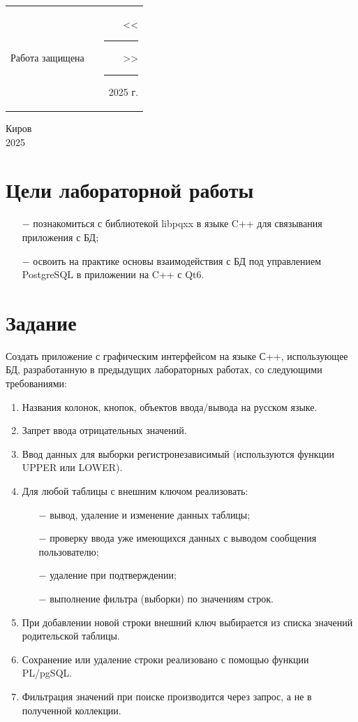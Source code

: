 \documentclass[oneside,a4paper,14pt]{extarticle}
\begin{document}
\noindent
\begin{tabular}{lp{58mm}r}
  Работа защищена &  & \hspace{13mm}<<\rule[-1mm]{5mm}{0.10mm}\/>>\rule[-1mm]{30mm}{0.10mm}\ 2025 г.
\end{tabular}
\vfill

\begin{center}
  Киров\\
  2025
\end{center}

\newpage\thispagestyle{plain}

\section*{Цели лабораторной работы}
\begin{itemize}
  \item[$-$] познакомиться с библиотекой libpqxx в языке C++ для связывания приложения с БД;
  \item[$-$] освоить на практике основы взаимодействия с БД под управлением PostgreSQL в приложении на C++ с Qt6.
\end{itemize}

\section*{Задание}
Создать приложение с графическим интерфейсом на языке С++, использующее БД, разработанную в предыдущих лабораторных работах, со следующими требованиями:
\begin{enumerate}
  \item Названия колонок, кнопок, объектов ввода/вывода на русском языке.
  \item Запрет ввода отрицательных значений.
  \item Ввод данных для выборки регистронезависимый (используются функции UPPER или LOWER).
  \item Для любой таблицы с внешним ключом реализовать:
        \begin{itemize}
          \item[$-$] вывод, удаление и изменение данных таблицы;
          \item[$-$] проверку ввода уже имеющихся данных с выводом сообщения пользователю;
          \item[$-$] удаление при подтверждении;
          \item[$-$] выполнение фильтра (выборки) по значениям строк.
        \end{itemize}
  \item При добавлении новой строки внешний ключ выбирается из списка значений родительской таблицы.
  \item Сохранение или удаление строки реализовано с помощью функции PL/pgSQL.
  \item Фильтрация значений при поиске производится через запрос, а не в полученной коллекции.
\end{enumerate}
\end{document}
